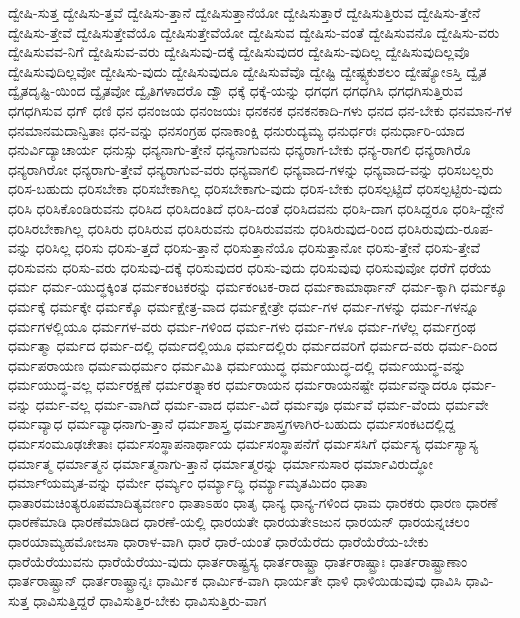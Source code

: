 {ದ್ವೇಷಿ-ಸುತ್ತ
ದ್ವೇಷಿಸು-ತ್ತವೆ
ದ್ವೇಷಿಸು-ತ್ತಾನೆ
ದ್ವೇಷಿಸುತ್ತಾನೆಯೋ
ದ್ವೇಷಿಸುತ್ತಾರೆ
ದ್ವೇಷಿಸುತ್ತಿರುವ
ದ್ವೇಷಿಸು-ತ್ತೇನೆ
ದ್ವೇಷಿಸು-ತ್ತೇವೆ
ದ್ವೇಷಿಸುತ್ತೇವೆಯೊ
ದ್ವೇಷಿಸುತ್ತೇವೆಯೋ
ದ್ವೇಷಿಸುವ
ದ್ವೇಷಿಸು-ವಂತೆ
ದ್ವೇಷಿಸುವನೊ
ದ್ವೇಷಿಸು-ವರು
ದ್ವೇಷಿಸುವವ-ನಿಗೆ
ದ್ವೇಷಿಸುವ-ವರು
ದ್ವೇಷಿಸುವು-ದಕ್ಕೆ
ದ್ವೇಷಿಸುವುದರ
ದ್ವೇಷಿಸು-ವುದಿಲ್ಲ
ದ್ವೇಷಿಸುವುದಿಲ್ಲವೊ
ದ್ವೇಷಿಸುವುದಿಲ್ಲವೋ
ದ್ವೇಷಿಸು-ವುದು
ದ್ವೇಷಿಸುವುದೂ
ದ್ವೇಷಿಸುವೆವೊ
ದ್ವೇಷ್ಟಿ
ದ್ವೇಷ್ಟ್ಯಕುಶಲಂ
ದ್ವೇಷ್ಯೋಽಸ್ತಿ
ದ್ವೈತ
ದ್ವೈತದೃಷ್ಟಿ-ಯಿಂದ
ದ್ವೈತವೋ
ದ್ವೈತಿಗಳಾದರೊ
ದ್ವೌ
ಧಕ್ಕೆ
ಧಕ್ಕೆ-ಯನ್ನು
ಧಗಧಗ
ಧಗಧಗಿಸಿ
ಧಗಧಗಿಸುತ್ತಿರುವ
ಧಗಧಗಿಸುವ
ಧಗ್
ಧಣಿ
ಧನ
ಧನಂಜಯ
ಧನಂಜಯಃ
ಧನಕನಕ
ಧನಕನಕಾದಿ-ಗಳು
ಧನದ
ಧನ-ಬೇಕು
ಧನಮಾನ-ಗಳ
ಧನಮಾನಮದಾನ್ವಿತಾಃ
ಧನ-ವನ್ನು
ಧನಸಂಗ್ರಹ
ಧನಾಕಾಂಕ್ಷಿ
ಧನುರುದ್ಯಮ್ಯ
ಧನುರ್ಧರಃ
ಧನುರ್ಧಾರಿ-ಯಾದ
ಧನುರ್ವಿದ್ಯಾಚಾರ್ಯ
ಧನುಸ್ಸು
ಧನ್ಯನಾಗು-ತ್ತೇನೆ
ಧನ್ಯನಾಗುವನು
ಧನ್ಯರಾಗ-ಬೇಕು
ಧನ್ಯ-ರಾಗಲಿ
ಧನ್ಯರಾಗಿರೊ
ಧನ್ಯರಾಗಿರೋ
ಧನ್ಯರಾಗು-ತ್ತೇವೆ
ಧನ್ಯರಾಗುವ-ವರು
ಧನ್ಯವಾಗಲಿ
ಧನ್ಯವಾದ-ಗಳನ್ನು
ಧನ್ಯವಾದ-ವನ್ನು
ಧರಿಸಬಲ್ಲರು
ಧರಿಸ-ಬಹುದು
ಧರಿಸಬೇಕಾ
ಧರಿಸಬೇಕಾಗಿಲ್ಲ
ಧರಿಸಬೇಕಾಗು-ವುದು
ಧರಿಸ-ಬೇಕು
ಧರಿಸಲ್ಪಟ್ಟಿದೆ
ಧರಿಸಲ್ಪಟ್ಟಿರು-ವುದು
ಧರಿಸಿ
ಧರಿಸಿಕೊಂಡಿರುವನು
ಧರಿಸಿದ
ಧರಿಸಿದಂತಿದೆ
ಧರಿಸಿ-ದಂತೆ
ಧರಿಸಿದವನು
ಧರಿಸಿ-ದಾಗ
ಧರಿಸಿದ್ದರೂ
ಧರಿಸಿ-ದ್ದೇನೆ
ಧರಿಸಿರಬೇಕಾಗಿಲ್ಲ
ಧರಿಸಿರು
ಧರಿಸಿರುವ
ಧರಿಸಿರುವನು
ಧರಿಸಿರುವವನು
ಧರಿಸಿರುವುದ-ರಿಂದ
ಧರಿಸಿರುವುದು-ರೂಪ-ವನ್ನು
ಧರಿಸಿಲ್ಲ
ಧರಿಸು
ಧರಿಸು-ತ್ತದೆ
ಧರಿಸು-ತ್ತಾನೆ
ಧರಿಸುತ್ತಾನೆಯೊ
ಧರಿಸುತ್ತಾನೋ
ಧರಿಸು-ತ್ತೇನೆ
ಧರಿಸು-ತ್ತೇವೆ
ಧರಿಸುವನು
ಧರಿಸು-ವರು
ಧರಿಸುವು-ದಕ್ಕೆ
ಧರಿಸುವುದರ
ಧರಿಸು-ವುದು
ಧರಿಸುವುವು
ಧರಿಸುವುವೋ
ಧರೆಗೆ
ಧರೆಯ
ಧರ್ಮ
ಧರ್ಮ-ಯುದ್ಧಕ್ಕಿಂತ
ಧರ್ಮಕಂಟಕರನ್ನು
ಧರ್ಮಕಂಟಕ-ರಾದ
ಧರ್ಮಕಾಮಾರ್ಥಾನ್
ಧರ್ಮ-ಕ್ಕಾಗಿ
ಧರ್ಮಕ್ಕೂ
ಧರ್ಮಕ್ಕೆ
ಧರ್ಮಕ್ಕೇ
ಧರ್ಮಕ್ಕೊ
ಧರ್ಮಕ್ಷೇತ್ರ-ವಾದ
ಧರ್ಮಕ್ಷೇತ್ರೇ
ಧರ್ಮ-ಗಳ
ಧರ್ಮ-ಗಳನ್ನು
ಧರ್ಮ-ಗಳನ್ನೂ
ಧರ್ಮಗಳಲ್ಲಿಯೂ
ಧರ್ಮಗಳ-ವರು
ಧರ್ಮ-ಗಳಿಂದ
ಧರ್ಮ-ಗಳು
ಧರ್ಮ-ಗಳೂ
ಧರ್ಮ-ಗಳೆಲ್ಲ
ಧರ್ಮಗ್ರಂಥ
ಧರ್ಮತ್ಮಾ
ಧರ್ಮದ
ಧರ್ಮ-ದಲ್ಲಿ
ಧರ್ಮದಲ್ಲಿಯೂ
ಧರ್ಮದಲ್ಲಿರು
ಧರ್ಮದವರಿಗೆ
ಧರ್ಮದ-ವರು
ಧರ್ಮ-ದಿಂದ
ಧರ್ಮಪರಾಯಣ
ಧರ್ಮಮಧರ್ಮಂ
ಧರ್ಮಮಿತಿ
ಧರ್ಮಯುದ್ಧ
ಧರ್ಮಯುದ್ಧ-ದಲ್ಲಿ
ಧರ್ಮಯುದ್ಧ-ವನ್ನು
ಧರ್ಮಯುದ್ಧ-ವಲ್ಲ
ಧರ್ಮರಕ್ಷಣೆ
ಧರ್ಮರತ್ನಾಕರ
ಧರ್ಮರಾಯನ
ಧರ್ಮರಾಯನಷ್ಟೇ
ಧರ್ಮವನ್ನಾದರೂ
ಧರ್ಮ-ವನ್ನು
ಧರ್ಮ-ವಲ್ಲ
ಧರ್ಮ-ವಾಗಿದೆ
ಧರ್ಮ-ವಾದ
ಧರ್ಮ-ವಿದೆ
ಧರ್ಮವೂ
ಧರ್ಮವೆ
ಧರ್ಮ-ವೆಂದು
ಧರ್ಮವೇ
ಧರ್ಮವ್ಯಾಧ
ಧರ್ಮವ್ಯಾಧನಾಗು-ತ್ತಾನೆ
ಧರ್ಮಶಾಸ್ತ್ರ
ಧರ್ಮಶಾಸ್ತ್ರಗಳಾಗಿರ-ಬಹುದು
ಧರ್ಮಸಂಕಟದಲ್ಲಿದ್ದ
ಧರ್ಮಸಂಮೂಢಚೇತಾಃ
ಧರ್ಮಸಂಸ್ಥಾಪನಾರ್ಥಾಯ
ಧರ್ಮಸಂಸ್ಥಾಪನೆಗೆ
ಧರ್ಮಸಸಿಗೆ
ಧರ್ಮಸ್ಯ
ಧರ್ಮಸ್ಯಾಸ್ಯ
ಧರ್ಮಾತ್ಮ
ಧರ್ಮಾತ್ಮನ
ಧರ್ಮಾತ್ಮನಾಗು-ತ್ತಾನೆ
ಧರ್ಮಾತ್ಮರನ್ನು
ಧರ್ಮಾನುಸಾರ
ಧರ್ಮಾವಿರುದ್ಧೋ
ಧರ್ಮಾ್ಯಮೃತ-ವನ್ನು
ಧರ್ಮೇ
ಧರ್ಮ್ಯಂ
ಧರ್ಮ್ಯಾದ್ಧಿ
ಧರ್ಮ್ಯಾಮೃತಮಿದಂ
ಧಾತಾ
ಧಾತಾರಮಚಿಂತ್ಯರೂಪಮಾದಿತ್ಯವರ್ಣಂ
ಧಾತಾಽಹಂ
ಧಾತೃ
ಧಾನ್ಯ
ಧಾನ್ಯ-ಗಳಿಂದ
ಧಾಮ
ಧಾರಕರು
ಧಾರಣ
ಧಾರಣೆ
ಧಾರಣೆಮಾಡಿ
ಧಾರಣೆಮಾಡಿದ
ಧಾರಣೆ-ಯಲ್ಲಿ
ಧಾರಯತೇ
ಧಾರಯತೇಽಜುನ
ಧಾರಯನ್
ಧಾರಯನ್ನಚಲಂ
ಧಾರಯಾಮ್ಯಹಮೋಜಸಾ
ಧಾರಾಳ-ವಾಗಿ
ಧಾರೆ
ಧಾರೆ-ಯಂತೆ
ಧಾರೆಯೆರೆದು
ಧಾರೆಯೆರೆಯ-ಬೇಕು
ಧಾರೆಯೆರೆಯುವನು
ಧಾರೆಯೆರೆಯು-ವುದು
ಧಾರ್ತರಾಷ್ಟ್ರಸ್ಯ
ಧಾರ್ತರಾಷ್ಟ್ರಾ
ಧಾರ್ತರಾಷ್ಟ್ರಾಃ
ಧಾರ್ತರಾಷ್ಟ್ರಾಣಾಂ
ಧಾರ್ತರಾಷ್ಟ್ರಾನ್
ಧಾರ್ತರಾಷ್ಟ್ರಾನ್ನಃ
ಧಾರ್ಮಿಕ
ಧಾರ್ಮಿಕ-ವಾಗಿ
ಧಾರ್ಯತೇ
ಧಾಳಿ
ಧಾಳಿಯಿಡುವುವು
ಧಾವಿಸಿ
ಧಾವಿ-ಸುತ್ತ
ಧಾವಿಸುತ್ತಿದ್ದರೆ
ಧಾವಿಸುತ್ತಿರ-ಬೇಕು
ಧಾವಿಸುತ್ತಿರು-ವಾಗ
}
